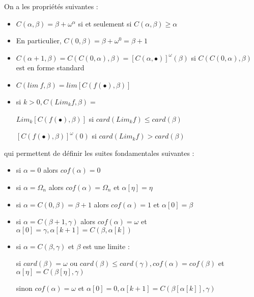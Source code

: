 \documentclass[12pt]{beamer}
\begin{document}
\begin{frame}

\footnotesize

On a les propriétés suivantes :

\begin{itemize}
     \setlength{\itemsep}{1pt}
     \setlength{\parskip}{0pt}
     \setlength{\parsep}{0pt}

\item \( C(\alpha,\beta) = \beta+\omega^\alpha \) si et seulement si \( C(\alpha,\beta) \ge \alpha \)

\item En particulier, \( C(0,\beta) = \beta+\omega^0 = \beta+1 \)

\item \( C(\alpha+1,\beta) = C(C(0,\alpha),\beta) = [C(\alpha,\bullet)]^\omega(\beta) \) si \( C(C(0,\alpha),\beta) \) est en forme standard

\item \( C(lim\ f,\beta) = lim [C(f(\bullet),\beta) ] \)

\item si \( k>0, C(Lim_k f,\beta) = \) 
 
 \( Lim_k [C(f(\bullet),\beta)] \) si \( card(Lim_k f) \le card(\beta) \)

 \( [C(f(\bullet),\beta)]^\omega(0) \) si \( card(Lim_k f) > card(\beta) \)


\end{itemize}

qui permettent de définir les suites fondamentales suivantes :

\begin{itemize}
     \setlength{\itemsep}{1pt}
     \setlength{\parskip}{0pt}
     \setlength{\parsep}{0pt}
\item si \( \alpha=0 \) alors \( cof(\alpha) = 0 \)
\item si \( \alpha = \Omega_n \) alors \( cof(\alpha) = \Omega_n \) et \( \alpha[\eta] = \eta \)
\item si \( \alpha = C(0,\beta) = \beta+1 \) alors \( cof(\alpha) = 1 \) et \( \alpha[0] = \beta \)
\item si \( \alpha = C(\beta+1,\gamma) \) alors \( cof(\alpha) = \omega \) et \( \alpha[0] = \gamma, \alpha[k+1] = C(\beta,\alpha[k]) \)
\item si \( \alpha = C(\beta,\gamma) \) et $\beta$ est une limite :
 
 si \( card(\beta) = \omega \) ou \( card(\beta) \le card(\gamma), cof(\alpha) = cof(\beta) \) et \( \alpha[\eta] = C(\beta[\eta],\gamma) \)
 
 sinon \( cof(\alpha) = \omega \) et \( \alpha[0] = 0, \alpha[k+1] = C(\beta[\alpha[k]], \gamma) \)
 
\end{itemize} 

\end{frame}
\end{document}
